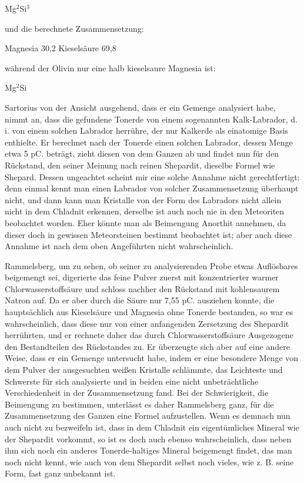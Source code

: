 \documentclass[a4paper, 11pt, oneside]{article}
\begin{document}
Mg$^{2}$Si$^{3}$

und die berechnete Zusammensetzung:

Magnesia 30,2
Kieselsäure 69,8

während der Olivin nur eine halb kieselsaure Magnesia ist:

Mg$^{2}$Si

Sartorius von der Ansicht ausgehend, dass er ein Gemenge analysiert habe, nimmt an, dass die gefundene Tonerde von einem sogenannten Kalk-Labrador, d. i. von einem solchen Labrador herrühre, der nur Kalkerde als einatomige Basis enthielte. Er berechnet nach der Tonerde einen solchen Labrador, dessen Menge etwa 5 pC. beträgt, zieht diesen von dem Ganzen ab und findet nun für den Rückstand, den seiner Meinung nach reinen Shepardit, dieselbe Formel wie Shepard. Dessen ungeachtet scheint mir eine solche Annahme nicht gerechtfertigt; denn einmal kennt man einen Labrador von solcher Zusammensetzung überhaupt nicht, und dann kann man Kristalle von der Form des Labradors nicht allein nicht in dem Chladnit erkennen, derselbe ist auch noch nie in den Meteoriten beobachtet worden. Eher könnte man als Beimengung Anorthit annehmen, da dieser doch in gewissen Meteorsteinen bestimmt beobachtet ist; aber auch diese Annahme ist nach dem oben Angeführten nicht wahrscheinlich.

Rammelsberg, um zu sehen, ob seiner zu analysierenden Probe etwas Auflösbares beigemengt sei, digerierte das feine Pulver zuerst mit konzentrierter warmer Chlorwasserstoffsäure und schloss nachher den Rückstand mit kohlensaurem Natron auf. Da er aber durch die Säure nur 7,55 pC. ausziehen konnte, die hauptsächlich aus Kieselsäure und Magnesia ohne Tonerde bestanden, so war es wahrscheinlich, dass diese nur von einer anfangenden Zersetzung des Shepardit herrührten, und er rechnete daher das durch Chlorwasserstoffsäure Ausgezogene den Bestandteilen des Rückstandes zu. Er überzeugte sich aber auf eine andere Weise, dass er ein Gemenge untersucht habe, indem er eine besondere Menge von dem Pulver der ausgesuchten weißen Kristalle schlämmte, das Leichteste und Schwerste für sich analysierte und in beiden eine nicht unbeträchtliche Verschiedenheit in der Zusammensetzung fand. Bei der Schwierigkeit, die Beimengung zu bestimmen, unterlässt es daher Rammelsberg ganz, für die Zusammensetzung des Ganzen eine Formel aufzustellen. Wenn es demnach nun auch nicht zu bezweifeln ist, dass in dem Chladnit ein eigentümliches Mineral wie der Shepardit vorkommt, so ist es doch auch ebenso wahrscheinlich, dass neben ihm sich noch ein anderes Tonerde-haltiges Mineral beigemengt findet, das man noch nicht kennt, wie auch von dem Shepardit selbst noch vieles, wie z. B. seine Form, fast ganz unbekannt ist.
\end{document}
